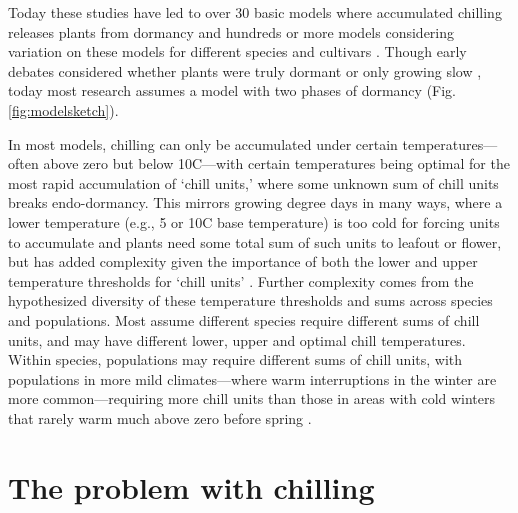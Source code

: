 \documentclass[11pt]{article}
\begin{document}
Today these studies have led to over 30 basic models where accumulated chilling releases plants from dormancy and hundreds or more models considering variation on these models for different species and cultivars \citep[][]{basler2016evaluating,hufkens2018integrated}. Though early debates considered whether plants were truly dormant or only growing slow \citep[`dormancy' or `rest' versus `quiescent';][]{considine2016language}, today most research assumes a model with two phases of dormancy (Fig. \ref{fig:modelsketch}). 

In most models, chilling can only be accumulated under certain temperatures---often above zero but below 10\degree C---with certain temperatures 
being optimal for the most rapid accumulation of `chill units,' where some unknown sum of chill units breaks endo-dormancy. This mirrors growing degree days in many ways, where a lower temperature (e.g., 5 or 10\degree C base temperature) is too cold for forcing units to accumulate and plants need some total sum of such units to leafout or flower, but has added complexity given the importance of both the lower and upper temperature thresholds 
for `chill units' \citep[whereas growing degree day models can often ignore the upper threshold, estimated at 25\degree C or above, as it is rarely reached in natural spring conditions][]{mcmaster1997growing,li2021comparisons}. Further complexity comes from the hypothesized diversity of these temperature thresholds and sums across species and populations. Most assume different species require different sums of chill units, and may have different lower, upper and optimal chill temperatures. Within species, populations may require different sums of chill units, with populations in more mild climates---where warm interruptions in the winter are more common---requiring more chill units than those in areas with cold winters that rarely warm much above zero before spring \citep{campbell1979,leinonen1996dependence}. 

\section*{The problem with chilling} 
\end{document}
